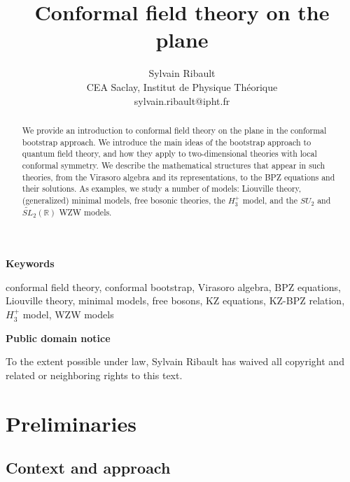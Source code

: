 \documentclass[12pt, a4paper, notitlepage, twoside]{report}
\title{\bfseries Conformal field theory on the plane}
\author{Sylvain Ribault \vspace{2mm}
\\
{\normalsize CEA Saclay, Institut de Physique Th\'eorique}
 \\
 {\footnotesize \ttfamily sylvain.ribault@ipht.fr }
}
\numberwithin{equation}{section}
\theoremstyle{break}
\begin{document}
\maketitle

\begin{abstract}
We provide an introduction to conformal field theory on the plane in the conformal bootstrap approach.
We introduce the main ideas of the bootstrap approach to quantum field theory, and how they apply to two-dimensional theories with local conformal symmetry.
We describe the mathematical structures that appear in such theories, from the Virasoro algebra and its representations, to the BPZ equations and their solutions.
As examples, we study a number of models: Liouville theory, (generalized) minimal models, free bosonic theories, the $H_3^+$ model, and the $SU_2$ and $\widetilde{SL}_2(\mathbb{R})$ WZW models. 
\end{abstract}
\vspace{1cm}
\begin{center}
 \textbf{Keywords}
\end{center}
\noindent conformal field theory, conformal bootstrap, Virasoro algebra, BPZ equations, Liouville theory, minimal models, free bosons,
KZ equations, KZ-BPZ relation, $H_3^+$ model, WZW models

\vspace{1cm}
\begin{center}
\textbf{Public domain notice}
\end{center}
\noindent To the extent possible under law, Sylvain Ribault has waived all copyright and related or neighboring rights to this text.

\tableofcontents
\hypersetup{linkcolor=blue}

\addtocounter{chapter}{-1}

\chapter{Preliminaries \label{secprel}}

\section{Context and approach}
\end{document}
